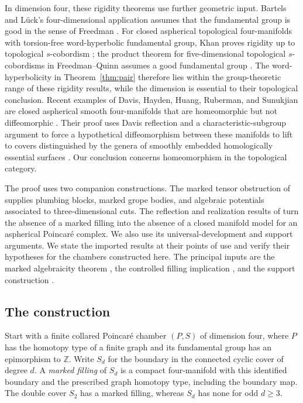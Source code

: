 In dimension four, these rigidity theorems use further geometric input.  Bartels and
L\"uck's four-dimensional application assumes that the fundamental
group is good in the sense of Freedman
\cite[Proposition~0.3]{BartelsLueck2012}.  For closed aspherical
topological four-manifolds with torsion-free word-hyperbolic fundamental
group, Khan proves rigidity up to topological $s$-cobordism
\cite[Theorem~1.22 and Corollary~1.23]{Khan2012}; the product theorem for
five-dimensional topological $s$-cobordisms in Freedman--Quinn assumes
a good fundamental group \cite[Theorem~7.1A]{FreedmanQuinn1990}.
The word-hyperbolicity in Theorem~\ref{thm:pair} therefore lies within
the group-theoretic range of these rigidity results, while the
dimension is essential to their topological conclusion.  Recent
examples of Davis, Hayden, Huang, Ruberman, and Sunukjian are closed
aspherical smooth four-manifolds that are homeomorphic but not
diffeomorphic \cite[Theorem~1.1]{DHHRS2026}.  Their proof uses Davis
reflection and a characteristic-subgroup argument to force a hypothetical
diffeomorphism between these manifolds to lift to covers distinguished by
the genera of smoothly embedded homologically essential surfaces
\cite{DHHRS2026}.  Our conclusion concerns
homeomorphism in the topological category.

The proof uses two companion constructions.  The marked tensor
obstruction of \cite{MT} supplies plumbing blocks, marked grope bodies,
and algebraic potentials associated to three-dimensional cuts.  The
reflection and realization results of \cite{PD} turn the absence
of a marked filling into the absence of a closed manifold model for
an aspherical Poincar\'e complex.  We also use its universal-development and support arguments.
We state the imported results at their points of use and verify their
hypotheses for the chambers constructed here.  The principal inputs
are the marked algebraicity theorem \cite[Theorem~5.1]{MT}, the
controlled filling implication \cite[Sections~3--5]{PD}, and the
support construction \cite[Lemma~3.3]{PD}.

\subsection*{The construction}

Start with a finite collared Poincar\'e chamber $(P,S)$ of dimension
four, where $P$ has the homotopy type of a finite graph and its
fundamental group has an epimorphism to $\mathbb Z$.  Write $S_d$ for
the boundary in the connected cyclic cover of degree $d$.  A
\emph{marked filling} of $S_d$ is a compact four-manifold with this
identified boundary and the prescribed graph homotopy type, including
the boundary map.  The double cover $S_2$ has a marked filling, whereas
$S_d$ has none for odd $d\geq3$.


